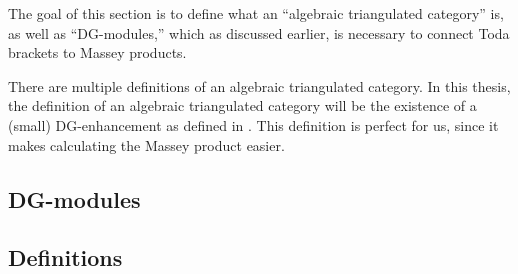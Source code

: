 The goal of this section is to define what an ``algebraic triangulated category'' is, as well as ``DG-modules,'' which as discussed earlier, is necessary to connect Toda brackets to Massey products.

There are multiple definitions of an algebraic triangulated category. In this thesis, the definition of an algebraic triangulated category will be the existence of a (small) DG-enhancement as defined in \cite[Definition 3.1.3]{Jasso-Muro_2023}. This definition is perfect for us, since it makes calculating the Massey product easier.

\subsection{DG-modules}


\subsection{Definitions}
\label{sec:alg_tri_cat_def}
